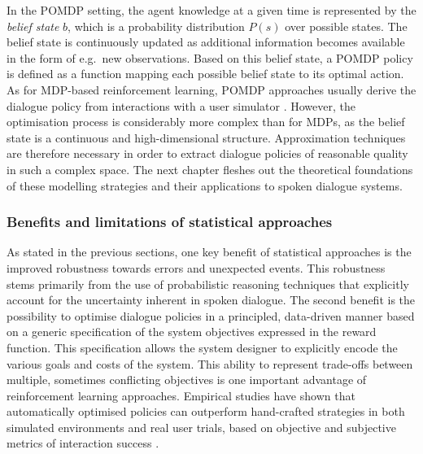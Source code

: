 In the POMDP setting, the agent knowledge at a given time is represented by the \textit{belief state} $b$, which is a probability distribution $P(s)$ over possible states.  The belief state is continuously updated as additional information becomes available in the form of e.g.\ new observations. Based on this belief state, a POMDP policy is defined as a function mapping each possible belief state to its optimal action.  As for MDP-based reinforcement learning, POMDP approaches usually derive the dialogue policy from interactions with a user simulator  \citep{Young:2010,Thomson:2010:BUD:1772996.1773040, daubigney2012}. However, the optimisation process is considerably more complex than for MDPs, as the belief state is a continuous and high-dimensional structure. Approximation techniques are therefore necessary in order to extract dialogue policies of reasonable quality in such a complex space. The next chapter fleshes out the theoretical foundations of these modelling strategies and their applications to spoken dialogue systems.

\subsubsection*{Benefits and limitations of statistical approaches}


As stated in the previous sections, one key benefit of statistical approaches is the improved robustness towards errors and unexpected events. This robustness stems primarily from the use of probabilistic reasoning techniques that explicitly account for the uncertainty inherent in spoken dialogue.  The second benefit is the possibility to optimise dialogue policies in a principled, data-driven manner based on a generic specification of the system objectives expressed in the reward function.  This specification allows the system designer to explicitly encode the various goals and costs of the system. This ability to represent trade-offs between multiple, sometimes conflicting objectives is one important advantage of reinforcement learning approaches.  Empirical studies have shown that automatically optimised policies can outperform hand-crafted strategies in both simulated environments and  real user trials, based on objective and subjective metrics of interaction success \citep{Supelec270,6407655}. 

